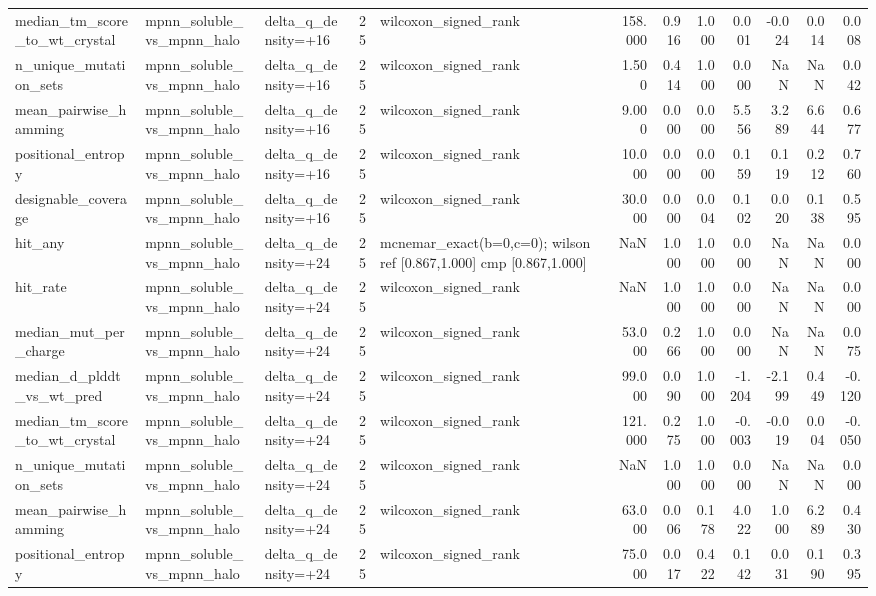 \begin{table}
{\begin{tabular}{lllrlrrrrrrr}
median\_tm\_score\_to\_wt\_crystal & mpnn\_soluble\_vs\_mpnn\_halo & delta\_q\_density=+16 & 25 & wilcoxon\_signed\_rank & 158.000 & 0.916 & 1.000 & 0.001 & -0.024 & 0.014 & 0.008 \\
n\_unique\_mutation\_sets & mpnn\_soluble\_vs\_mpnn\_halo & delta\_q\_density=+16 & 25 & wilcoxon\_signed\_rank & 1.500 & 0.414 & 1.000 & 0.000 & NaN & NaN & 0.042 \\
mean\_pairwise\_hamming & mpnn\_soluble\_vs\_mpnn\_halo & delta\_q\_density=+16 & 25 & wilcoxon\_signed\_rank & 9.000 & 0.000 & 0.000 & 5.556 & 3.289 & 6.644 & 0.677 \\
positional\_entropy & mpnn\_soluble\_vs\_mpnn\_halo & delta\_q\_density=+16 & 25 & wilcoxon\_signed\_rank & 10.000 & 0.000 & 0.000 & 0.159 & 0.119 & 0.212 & 0.760 \\
designable\_coverage & mpnn\_soluble\_vs\_mpnn\_halo & delta\_q\_density=+16 & 25 & wilcoxon\_signed\_rank & 30.000 & 0.000 & 0.004 & 0.102 & 0.020 & 0.138 & 0.595 \\
hit\_any & mpnn\_soluble\_vs\_mpnn\_halo & delta\_q\_density=+24 & 25 & mcnemar\_exact(b=0,c=0); wilson ref [0.867,1.000] cmp [0.867,1.000] & NaN & 1.000 & 1.000 & 0.000 & NaN & NaN & 0.000 \\
hit\_rate & mpnn\_soluble\_vs\_mpnn\_halo & delta\_q\_density=+24 & 25 & wilcoxon\_signed\_rank & NaN & 1.000 & 1.000 & 0.000 & NaN & NaN & 0.000 \\
median\_mut\_per\_charge & mpnn\_soluble\_vs\_mpnn\_halo & delta\_q\_density=+24 & 25 & wilcoxon\_signed\_rank & 53.000 & 0.266 & 1.000 & 0.000 & NaN & NaN & 0.075 \\
median\_d\_plddt\_vs\_wt\_pred & mpnn\_soluble\_vs\_mpnn\_halo & delta\_q\_density=+24 & 25 & wilcoxon\_signed\_rank & 99.000 & 0.090 & 1.000 & -1.204 & -2.199 & 0.449 & -0.120 \\
median\_tm\_score\_to\_wt\_crystal & mpnn\_soluble\_vs\_mpnn\_halo & delta\_q\_density=+24 & 25 & wilcoxon\_signed\_rank & 121.000 & 0.275 & 1.000 & -0.003 & -0.019 & 0.004 & -0.050 \\
n\_unique\_mutation\_sets & mpnn\_soluble\_vs\_mpnn\_halo & delta\_q\_density=+24 & 25 & wilcoxon\_signed\_rank & NaN & 1.000 & 1.000 & 0.000 & NaN & NaN & 0.000 \\
mean\_pairwise\_hamming & mpnn\_soluble\_vs\_mpnn\_halo & delta\_q\_density=+24 & 25 & wilcoxon\_signed\_rank & 63.000 & 0.006 & 0.178 & 4.022 & 1.000 & 6.289 & 0.430 \\
positional\_entropy & mpnn\_soluble\_vs\_mpnn\_halo & delta\_q\_density=+24 & 25 & wilcoxon\_signed\_rank & 75.000 & 0.017 & 0.422 & 0.142 & 0.031 & 0.190 & 0.395 \\

\end{tabular}}
\end{table}
